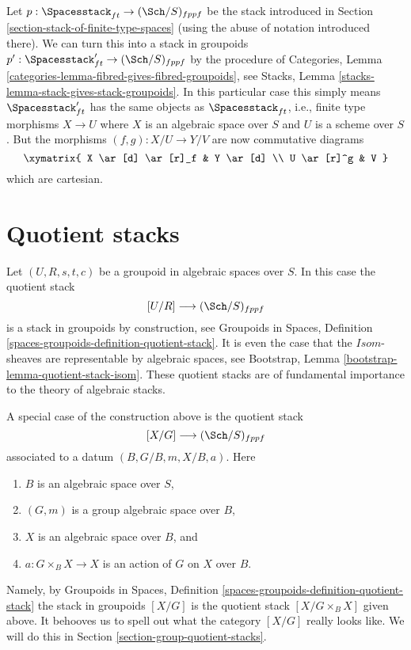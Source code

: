 \noindent
Let $p : \Spacesstack_{ft} \to (\Sch/S)_{fppf}$ be the stack
introduced in
Section \ref{section-stack-of-finite-type-spaces}
(using the abuse of notation introduced there).
We can turn this into a stack in groupoids
$p' : \Spacesstack_{ft}' \to (\Sch/S)_{fppf}$ by
the procedure of
Categories, Lemma \ref{categories-lemma-fibred-gives-fibred-groupoids},
see
Stacks, Lemma \ref{stacks-lemma-stack-gives-stack-groupoids}.
In this particular case this simply means $\Spacesstack_{ft}'$
has the same objects as $\Spacesstack_{ft}$, i.e., finite type morphisms
$X \to U$ where $X$ is an algebraic space over $S$ and $U$ is a scheme
over $S$. But the morphisms $(f, g) : X/U \to Y/V$ are now
commutative diagrams
$$
\xymatrix{
X \ar[d] \ar[r]_f & Y \ar[d] \\
U \ar[r]^g & V
}
$$
which are cartesian.



\section{Quotient stacks}
\label{section-quotient-stacks}

\noindent
Let $(U, R, s, t, c)$ be a groupoid in algebraic spaces over $S$.
In this case the quotient stack
$$
[U/R] \longrightarrow (\Sch/S)_{fppf}
$$
is a stack in groupoids by construction, see
Groupoids in Spaces,
Definition \ref{spaces-groupoids-definition-quotient-stack}.
It is even the case that the $\mathit{Isom}$-sheaves are
representable by algebraic spaces, see
Bootstrap, Lemma \ref{bootstrap-lemma-quotient-stack-isom}.
These quotient stacks are of fundamental importance to the theory of
algebraic stacks.

\medskip\noindent
A special case of the construction above is the quotient stack
$$
[X/G] \longrightarrow (\Sch/S)_{fppf}
$$
associated to a datum $(B, G/B, m, X/B, a)$. Here
\begin{enumerate}
\item $B$ is an algebraic space over $S$,
\item $(G, m)$ is a group algebraic space over $B$,
\item $X$ is an algebraic space over $B$, and
\item $a : G \times_B X \to X$ is an action of $G$ on $X$ over $B$.
\end{enumerate}
Namely, by
Groupoids in Spaces,
Definition \ref{spaces-groupoids-definition-quotient-stack}
the stack in groupoids $[X/G]$ is the
quotient stack $[X/G \times_B X]$ given above. It behooves us to
spell out what the category $[X/G]$ really looks like. We will do this in
Section \ref{section-group-quotient-stacks}.



